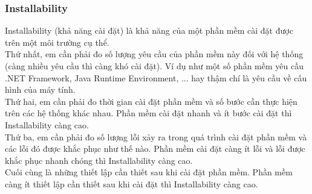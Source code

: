 \documentclass[14pt]{extarticle}
\begin{document}
\subsubsection{Installability}
Installability (khả năng cài đặt) là khả năng của một phần mềm cài đặt
được trên một môi trường cụ thể.\\
Thứ nhất, em cần phải đo số lượng yêu cầu của phần mềm này đối với hệ thống
(càng nhiều yêu cầu thì càng khó cài đặt). Ví dụ như một số phần mềm yêu
cầu .NET Framework, Java Runtime Environment, ... hay thậm chí là yêu cầu về 
cấu hình của máy tính.\\
Thứ hai, em cần phải đo thời gian cài đặt phần mềm và số bước cần thực hiện
trên các hệ thống khác nhau. Phần mềm cài đặt nhanh và ít bước cài đặt
thì Installability càng cao.\\
Thứ ba, em cần phải đo số lượng lỗi xảy ra trong quá trình cài đặt phần mềm
và các lỗi đó được khắc phục như thế nào. Phần mềm cài đặt càng ít lỗi
và lỗi được khắc phục nhanh chóng thì Installability càng cao.\\
Cuối cùng là những thiết lập cần thiết sau khi cài đặt phần mềm. Phần mềm
càng ít thiết lập cần thiết sau khi cài đặt thì Installability càng cao.
\end{document}
